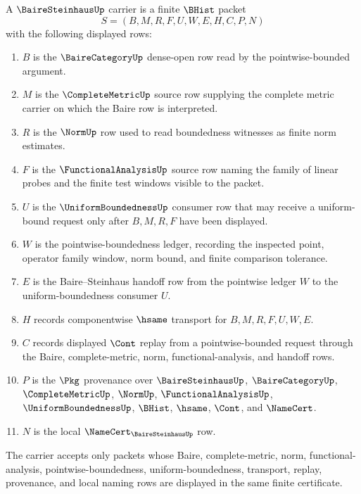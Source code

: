 \begin{definition}
\label{def:baire-steinhaus-carrier}
A $\BaireSteinhausUp$ carrier is a finite $\BHist$ packet
$$
S=(B,M,R,F,U,W,E,H,C,P,N)
$$
with the following displayed rows:
\begin{enumerate}
\item $B$ is the $\BaireCategoryUp$ dense-open row read by the pointwise-bounded argument.
\item $M$ is the $\CompleteMetricUp$ source row supplying the complete metric carrier on which the Baire row is interpreted.
\item $R$ is the $\NormUp$ row used to read boundedness witnesses as finite norm estimates.
\item $F$ is the $\FunctionalAnalysisUp$ source row naming the family of linear probes and the finite test windows visible to the packet.
\item $U$ is the $\UniformBoundednessUp$ consumer row that may receive a uniform-bound request only after $B,M,R,F$ have been displayed.
\item $W$ is the pointwise-boundedness ledger, recording the inspected point, operator family window, norm bound, and finite comparison tolerance.
\item $E$ is the Baire--Steinhaus handoff row from the pointwise ledger $W$ to the uniform-boundedness consumer $U$.
\item $H$ records componentwise $\hsame$ transport for $B,M,R,F,U,W,E$.
\item $C$ records displayed $\Cont$ replay from a pointwise-bounded request through the Baire, complete-metric, norm, functional-analysis, and handoff rows.
\item $P$ is the $\Pkg$ provenance over $\BaireSteinhausUp$, $\BaireCategoryUp$, $\CompleteMetricUp$, $\NormUp$, $\FunctionalAnalysisUp$, $\UniformBoundednessUp$, $\BHist$, $\hsame$, $\Cont$, and $\NameCert$.
\item $N$ is the local $\NameCert_{\BaireSteinhausUp}$ row.
\end{enumerate}
The carrier accepts only packets whose Baire, complete-metric, norm, functional-analysis, pointwise-boundedness, uniform-boundedness, transport, replay, provenance, and local naming rows are displayed in the same finite certificate.
\end{definition}

